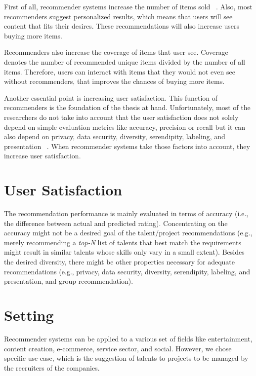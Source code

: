 First of all, recommender systems increase the number of items sold  ~\parencite{Ricci2015}.  Also, most recommenders suggest personalized results, which means that users will see content that fits their desires. These recommendations will also increase users buying more items.

Recommenders also increase the coverage of items that user see. Coverage denotes the number of recommended unique items divided by the number of all items. Therefore, users can interact with items that they would not even see without recommenders, that improves the chances of buying more items.

Another essential point is increasing user satisfaction. This function of recommenders is the foundation of the thesis at hand. Unfortunately, most of the researchers do not take into account that the user satisfaction does not solely depend on simple evaluation metrics like accuracy, precision or recall but it can also depend on privacy, data security, diversity, serendipity, labeling, and presentation ~\parencite{Beel2016}. When recommender systems take those factors into account, they increase user satisfaction.

\section{User Satisfaction}

The recommendation performance is mainly evaluated in terms of accuracy (i.e., the difference between actual and predicted rating). Concentrating on the accuracy might not be a desired goal of the talent/project recommendations (e.g., merely recommending a \textit{top-N} list of talents that best match the requirements might result in similar talents whose skills only vary in a small extent). Besides the desired diversity, there might be other properties necessary for adequate recommendations (e.g., privacy, data security, diversity, serendipity, labeling, and presentation, and group recommendation).

\section{Setting}

Recommender systems can be applied to a various set of fields like entertainment, content creation, e-commerce, service sector, and social. However, we chose specific use-case, which is the suggestion of talents to projects to be managed by the recruiters of the companies.


